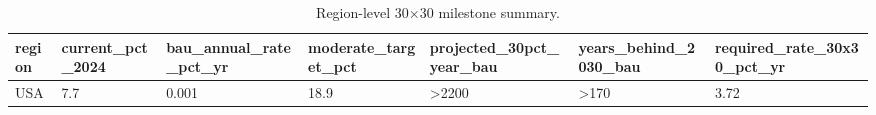 \begin{table}[htbp]
\centering
\small
\begin{tabular}{lllllll}
\hline
region & current\_pct\_2024 & bau\_annual\_rate\_pct\_yr & moderate\_target\_pct & projected\_30pct\_year\_bau & years\_behind\_2030\_bau & required\_rate\_30x30\_pct\_yr \\
\hline
USA & 7.7 & 0.001 & 18.9 & >2200 & >170 & 3.72 \\
\hline
\end{tabular}
\caption{Region-level 30×30 milestone summary.}
\label{tab:pathway_milestone}
\end{table}